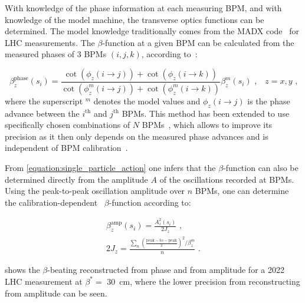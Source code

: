 With knowledge of the phase information at each measuring BPM, and with knowledge of the model machine, the transverse optics functions can be determined.
The model knowledge traditionally comes from the \gls{MADX} code~\cite{CODE:MADX_guide} for LHC measurements.
The \(\beta\)-function at a given BPM can be calculated from the measured phases of \num{3} BPMs \((i, j, k)\), according to~\cite{PHD:Castro,BOOK:Minty:Measurements_Control_Charged_Particle_Beams}:

\begin{equation}
  \beta_z^{\mathrm{phase}}(s_i) = \frac{\cot \left(\phi_z(i \rightarrow j)\right) + \cot \left(\phi_z(i \rightarrow k)\right)}{\cot \left(\phi^m_z(i \rightarrow j)\right) + \cot \left(\phi^m_z(i \rightarrow k)\right)} \beta^m_z(s_i)  \text{ ,} \quad z = x, y \text{ ,}
  \label{equation:beta_from_phase}
\end{equation}
where the superscript \(^m\) denotes the model values and \(\phi_z(i \rightarrow j)\) is the phase advance between the \(i^{\mathrm{th}}\) and \(j^{\mathrm{th}}\) BPMs.
This method has been extended to use specifically chosen combinations of \(N\) BPMs~\cite{PRAB:Langner:N_BPM_Method,PRAB:Wegscheider:Analytical_N_BPM_Method}, which allows to improve its precision as it then only depends on the measured phase advances and is independent of BPM calibration~\cite{PRAB:Langner:Optics_Measurement_Algorithms_Error_Analysis_Proton_Energy_Frontier}.

From \cref{equation:single_particle_action} one infers that the \(\beta\)-function can also be determined directly from the amplitude \(A\) of the oscillations recorded at BPMs.
Using the peak-to-peak oscillation amplitude over \(n\) BPMs, one can determine the calibration-dependent~\cite{PRAB:GarciaTabares:BPM_Calibration} \(\beta\)-function according to:

\begin{equation}
  \begin{gathered}
    \beta_z^{\mathrm{amp}}(s_i) = \frac{A_z^2(s_i)}{2 J_z} \text{ ,} \\
    2 J_z                       = \frac{\sum_n \left(\frac{\mathrm{peak-to-peak}}{2}\right)^2 / \beta^m_z}{n} \text{ .}
  \end{gathered}
  \label{equation:beta_from_amplitude}
\end{equation}

 shows the \(\beta\)-beating reconstructed from phase and from amplitude for a \num{2022} LHC measurement at \(\beta^{\ast} =\) \qty{30}{\centi\meter}, where the lower precision from reconstructing from amplitude can be seen.

